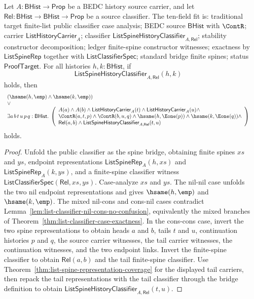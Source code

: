 \begin{theorem}
\label{thm:list-public-classifier-constructor-decomposition}
Let $A:\mathsf{BHist}\to\mathsf{Prop}$ be a BEDC history source carrier, and let
$\mathsf{Rel}:\mathsf{BHist}\to\mathsf{BHist}\to\mathsf{Prop}$ be a source
classifier. The ten-field fit is: traditional target finite-list public
classifier case analysis; BEDC source $\mathsf{BHist}$ with $\ContR$; carrier
$\mathsf{ListHistoryCarrier}_A$; classifier
$\mathsf{ListSpineHistoryClassifier}_{A,\mathsf{Rel}}$; stability constructor
decomposition; ledger finite-spine constructor witnesses; exactness by
$\mathsf{ListSpineRep}$ together with $\mathsf{ListClassifierSpec}$; standard
bridge finite spines; status $\mathsf{ProofTarget}$. For all histories
$h,k:\mathsf{BHist}$, if
$$
\mathsf{ListSpineHistoryClassifier}_{A,\mathsf{Rel}}(h,k)
$$
holds, then
$$
\begin{array}{l}
(\hsame(h,\emp)\land \hsame(k,\emp))\\
\lor\\
\exists a\,b\,t\,u\,p\,q:\mathsf{BHist}.\;
\left(
\begin{array}{l}
A(a)\land A(b)\land
\mathsf{ListHistoryCarrier}_A(t)\land
\mathsf{ListHistoryCarrier}_A(u)\land\\
\ContR(a,t,p)\land \ContR(b,u,q)\land
\hsame(h,\Eone(p))\land \hsame(k,\Eone(q))\land\\
\mathsf{Rel}(a,b)\land
\mathsf{ListSpineHistoryClassifier}_{A,\mathsf{Rel}}(t,u)
\end{array}
\right)
\end{array}
$$
holds.
\end{theorem}
\begin{proof}
Unfold the public classifier as the spine bridge, obtaining finite spines
$xs$ and $ys$, endpoint representations $\mathsf{ListSpineRep}_A(h,xs)$ and
$\mathsf{ListSpineRep}_A(k,ys)$, and a finite-spine classifier witness
$\mathsf{ListClassifierSpec}(\mathsf{Rel},xs,ys)$. Case-analyze $xs$ and $ys$.
The nil-nil case unfolds the two nil endpoint representations and gives
$\hsame(h,\emp)$ and $\hsame(k,\emp)$. The mixed nil-cons and cons-nil cases
contradict Lemma~\ref{lem:list-classifier-nil-cons-no-confusion}, equivalently
the mixed branches of Theorem~\ref{thm:list-classifier-case-exactness}. In the
cons-cons case, invert the two spine representations to obtain heads
$a$ and $b$, tails $t$ and $u$, continuation histories $p$ and $q$, the source
carrier witnesses, the tail carrier witnesses, the continuation witnesses, and
the two endpoint links. Invert the finite-spine classifier to obtain
$\mathsf{Rel}(a,b)$ and the tail finite-spine classifier. Use
Theorem~\ref{thm:list-spine-representation-coverage} for the displayed tail
carriers, then repack the tail representations with the tail classifier through
the bridge definition to obtain
$\mathsf{ListSpineHistoryClassifier}_{A,\mathsf{Rel}}(t,u)$.
\end{proof}

